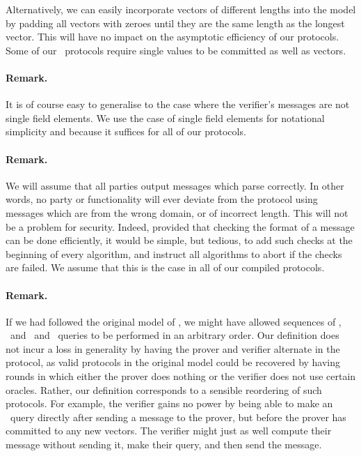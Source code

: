 Alternatively, we can easily incorporate vectors of different lengths into the model by padding all vectors with zeroes until they are the same length as the longest vector. This will have no impact on the asymptotic efficiency of our protocols. Some of our \ILC\ protocols require single values to be committed as well as vectors.

\paragraph{Remark.} It is of course easy to generalise to the case where the verifier's messages are not single field elements. We use the case of single field elements for notational simplicity and because it suffices for all of our protocols.

\paragraph{Remark.} We will assume that all parties output messages which parse correctly. In other words, no party or functionality will ever deviate from the protocol using messages which are from the wrong domain, or of incorrect length. This will not be a problem for security. Indeed, provided that checking the format of a message can be done efficiently, it would be simple, but tedious, to add such checks at the beginning of every algorithm, and instruct all algorithms to abort if the checks are failed. We assume that this is the case in all of our compiled protocols.

\paragraph{Remark.} If we had followed the original model of \cite{BootleCGGHJ17}, we might have allowed sequences of \ILCcommit, \ILCsend\ and \ILCopen\ and \ILCcheck\ queries to be performed in an arbitrary order. Our definition does not incur a loss in generality by having the prover and verifier alternate in the protocol, as valid protocols in the original model could be recovered by having rounds in which either the prover does nothing or the verifier does not use certain oracles. Rather, our definition corresponds to a sensible reordering of such protocols. For example, the verifier gains no power by being able to make an \ILCopen\ query directly after sending a message to the prover, but before the prover has committed to any new vectors. The verifier might just as well compute their message without sending it, make their query, and then send the message.

